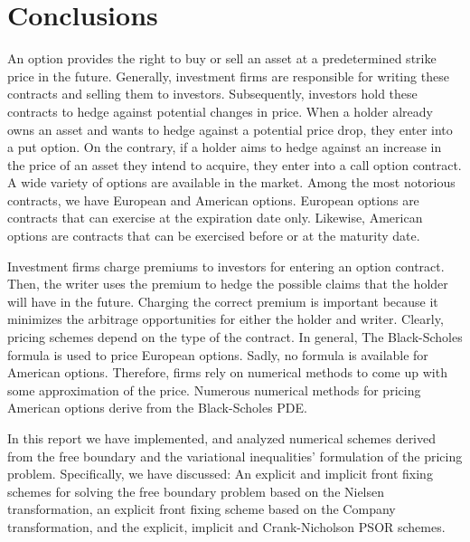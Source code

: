 \section{Conclusions}

An option provides the right to buy or sell an asset at a predetermined strike price in the future. Generally, investment firms are responsible for writing these contracts and selling them to investors. Subsequently, investors hold these contracts to hedge against potential changes in price. When a holder already owns an asset and wants to hedge against a potential price drop, they enter into a put option. On the contrary, if a holder aims to hedge against an increase in the price of an asset they intend to acquire, they enter into a call option contract. A wide variety of options are available in the market. Among the most notorious contracts, we have European and American options. European options are contracts that can exercise at the expiration date only. Likewise, American options are contracts that can be exercised before or at the maturity date. 

Investment firms charge premiums to investors for entering an option contract. Then, the writer uses the premium to hedge the possible claims that the holder will have in the future. Charging the correct premium is important because it minimizes the arbitrage opportunities for either the holder and writer. Clearly, pricing schemes depend on the type of the contract. In general, The Black-Scholes formula is used to price European options. Sadly, no formula is available for American options. Therefore, firms rely on numerical methods to come up with some approximation of the price. Numerous numerical methods for pricing American options derive from the Black-Scholes PDE. 

In this report we have implemented, and analyzed numerical schemes derived from the free boundary and the variational inequalities' formulation of the pricing problem. Specifically, we have discussed: An explicit and implicit front fixing schemes for solving the free boundary problem based on the Nielsen transformation, an explicit front fixing scheme based on the Company transformation, and the explicit, implicit and Crank-Nicholson PSOR schemes.

